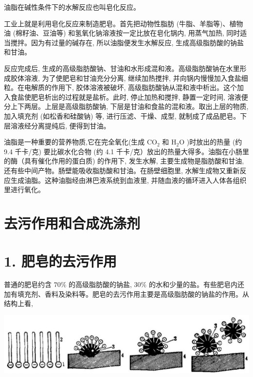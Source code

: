 \documentclass[10pt]{article}
\begin{document}
油脂在碱性条件下的水解反应也叫皂化反应。

工业上就是利用皂化反应来制造肥皂。首先把动物性脂肪 (牛脂、羊脂等)、植物油 (棉籽油、豆油等) 和氢氧化钠溶液按一定比放在皂化锅内, 用蒸气加热, 同时适当搅拌。因为有过量的碱存在, 所以油脂便发生水解反应, 生成高级脂肪酸的钠盐和甘油。

反应完成后, 生成的高级脂肪酸钠、甘油和水形成混和液。高级脂肪酸钠在水里形成胶体溶液, 为了使肥皂和甘油充分分离, 继续加热搅拌, 并向锅内慢慢加入食盐细粒。在电解质的作用下, 胶体溶液被破坏, 高级脂肪酸钠从混和液中析出。这个加入食盐使肥皂析出的过程就是盐析。此时, 停止加热和搅拌, 静置一定时间, 溶液便分上下两层。上层是高级脂肪酸钠, 下层是甘油和食盐的混和液。取出上层的物质, 加入填充剂 (如松香和硅酸钠) 等, 进行压滤、干燥、成型, 就制成了成品肥皂。下层溶液经分离提纯后, 便得到甘油。

油脂是一种重要的营养物质,它在完全氧化(生成 \({\mathrm{{CO}}}_{2}\) 和 \({\mathrm{H}}_{2}\mathrm{O}\) )时放出的热量 (约 9.4 千卡/克) 要比碳水化合物 (约 4.1 千卡/克）放出的热量大得多。油脂在小肠里的酶（具有催化作用的蛋白质) 的作用下, 发生水解, 主要生成物是脂肪酸和甘油, 还有些中间产物。肠壁能吸收脂肪酸和甘油。在肠壁细胞里, 水解生成物又重新反应生成油脂。这种油脂经由淋巴液系统到血液里, 并随血液的循环进入人体各组织里进行氧化。

\section*{去污作用和合成洗涤剂}

\section*{1. 肥皂的去污作用}

普通的肥皂约含 \({70}\%\) 的高级脂肪酸的钠盐, \({30}\%\) 的水和少量的盐。有些肥皂内还加有填充剂、香料及染料等。肥皂的去污作用主要是高级脂肪酸的钠盐的作用。从结构上看,

\begin{center}
\includegraphics[max width=1.0\textwidth]{images/01912d16-be99-77bb-9535-4f3ed8d9946f_147_316458.jpg}
\end{center}
\end{document}
